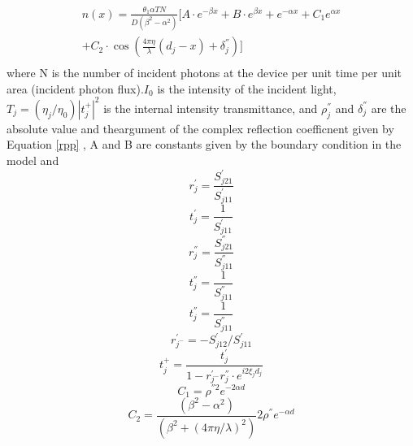 \documentclass{article}
\begin{document}
\begin{equation}
\begin{multlined}
   n(x)=\frac{{{\theta }_{1}}\alpha TN}{D({{\beta }^{2}}-{{\alpha }^{2}})}[A\cdot {{e}^{-\beta x}}+B\cdot {{e}^{\beta x}}+{{e}^{-\alpha x}}+{{C}_{1}}{{e}^{\alpha x}} \\ 
  +{{C}_{2}}\cdot \cos \left( \frac{4\pi \eta }{\lambda }({{d}_{j}}-x)+\delta _{j}^{''} \right)] \\ 
\end{multlined}
\label{exctiondensity}
\end{equation}
where N is the number of incident photons at the device per unit time per unit
area (incident photon flux).$I_0$ is the intensity of the incident
light,${{T}_{j}}=\left( {{\eta }_{j}}/{{\eta }_{0}} \right){{\left| t_{j}^{+}
\right|}^{2}}$ is the internal intensity transmittance, and $\rho _{j}^{''}$ and
$\delta _{j}^{''}$ are the absolute value and theargument of the complex
reflection coefficnent given by Equation \ref{rpp} , A and B are constants given
by the boundary condition in the model and
\begin{equation}
r_{j}^{'}=\frac{S_{j21}^{'}}{S_{j11}^{'}}
\end{equation}
\begin{equation}
t_{j}^{'}=\frac{1}{S_{j11}^{'}}
\end{equation}
\begin{equation}
r_{j}^{''}=\frac{S_{j21}^{''}}{S_{j11}^{''}}
\label{rpp}
\end{equation}
\begin{equation}
t_{j}^{''}=\frac{1}{S_{j11}^{''}}
\end{equation}
\begin{equation}
t_{j}^{''}=\frac{1}{S_{j11}^{''}}
\end{equation}
\begin{equation}
r_{{{j}^{-}}}^{'}=-S_{j12}^{'}/S_{j11}^{'}
\end{equation}
\begin{equation}
t_{j}^{+}=\frac{t_{j}^{'}}{1-r_{{{j}^{-}}}^{'}r_{j}^{''}\cdot {{e}^{i2{{\xi
}_{j}}{{d}_{j}}}}}
\end{equation}
\begin{equation}
{{C}_{1}}={{\rho }^{''2}}{{e}^{-2\alpha d}}
\end{equation}
\begin{equation}
{{C}_{2}}=\frac{({{\beta }^{2}}-{{\alpha }^{2}})}{({{\beta }^{2}}+{{(4\pi \eta /\lambda )}^{2}})}2{{\rho }^{''}}{{e}^{-\alpha d}}
\end{equation}
\end{document}
